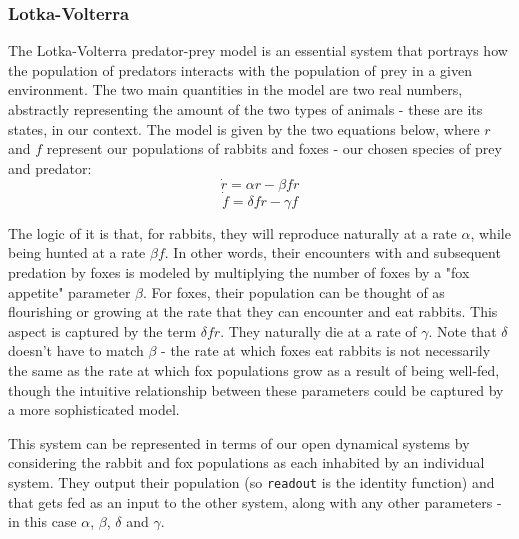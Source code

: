 \subsubsection{Lotka-Volterra}

The Lotka-Volterra predator-prey model is an essential system \cite{Murray2002} that portrays how the population of predators interacts with the population of prey in a given environment. The two main quantities in the model are two real numbers, abstractly representing the amount of the two types of animals - these are its states, in our context. The model is given by the two equations below, where $r$ and $f$ represent our populations of rabbits and foxes - our chosen species of prey and predator:
\begin{equation}
\dot{r} = \alpha r - \beta f r
\label{eq:rabbits}
\end{equation}
\begin{equation}
\dot{f} = \delta f r - \gamma f
\label{eq:foxes}
\end{equation}

The logic of it is that, for rabbits, they will reproduce naturally at a rate $\alpha$, while being hunted at a rate $\beta f$. In other words, their encounters with and subsequent predation by foxes is modeled by multiplying the number of foxes by a "fox appetite" parameter $\beta$. For foxes, their population can be thought of as flourishing or growing at the rate that they can encounter and eat rabbits. This aspect is captured by the term $\delta f r$. They naturally die at a rate of $\gamma$. Note that $\delta$ doesn't have to match $\beta$ - the rate at which foxes eat rabbits is not necessarily the same as the rate at which fox populations grow as a result of being well-fed, though the intuitive relationship between these parameters could be captured by a more sophisticated model.

This system can be represented in terms of our open dynamical systems by considering the rabbit and fox populations as each inhabited by an individual system. They output their population (so \texttt{readout} is the identity function) and that gets fed as an input to the other system, along with any other parameters - in this case $\alpha$, $\beta$, $\delta$ and $\gamma$.


